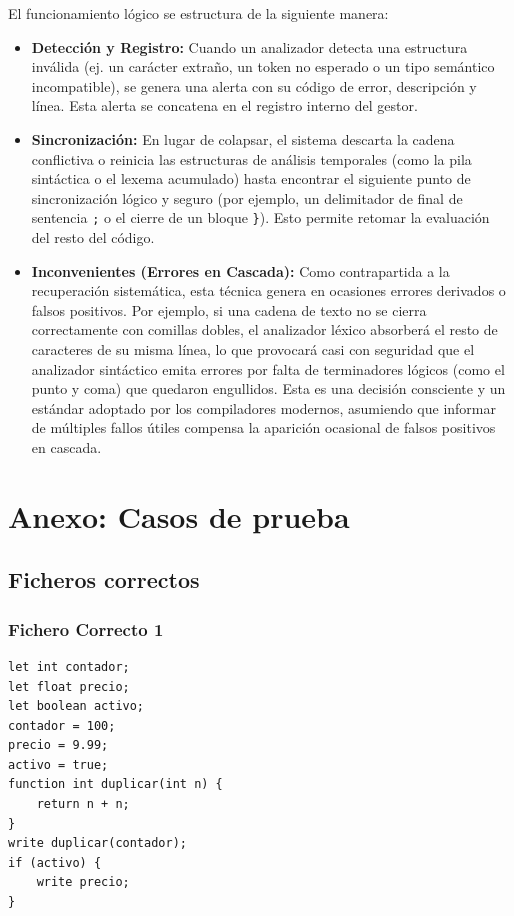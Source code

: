 \documentclass{article}
\begin{document}
El funcionamiento lógico se estructura de la siguiente manera:
\begin{itemize}
    \item \textbf{Detección y Registro:} Cuando un analizador detecta una estructura inválida (ej. un carácter extraño, un token no esperado o un tipo semántico incompatible), se genera una alerta con su código de error, descripción y línea. Esta alerta se concatena en el registro interno del gestor.
    \item \textbf{Sincronización:} En lugar de colapsar, el sistema descarta la cadena conflictiva o reinicia las estructuras de análisis temporales (como la pila sintáctica o el lexema acumulado) hasta encontrar el siguiente punto de sincronización lógico y seguro (por ejemplo, un delimitador de final de sentencia \texttt{;} o el cierre de un bloque \texttt{\}}). Esto permite retomar la evaluación del resto del código.
    \item \textbf{Inconvenientes (Errores en Cascada):} Como contrapartida a la recuperación sistemática, esta técnica genera en ocasiones errores derivados o falsos positivos. Por ejemplo, si una cadena de texto no se cierra correctamente con comillas dobles, el analizador léxico absorberá el resto de caracteres de su misma línea, lo que provocará casi con seguridad que el analizador sintáctico emita errores por falta de terminadores lógicos (como el punto y coma) que quedaron engullidos. Esta es una decisión consciente y un estándar adoptado por los compiladores modernos, asumiendo que informar de múltiples fallos útiles compensa la aparición ocasional de falsos positivos en cascada.
\end{itemize}

\newpage

\section{Anexo: Casos de prueba}

\subsection{Ficheros correctos}

\subsubsection{Fichero Correcto 1}
\begin{lstlisting}[title={fichero1.txt}]
let int contador;
let float precio;
let boolean activo;
contador = 100;
precio = 9.99;
activo = true;
function int duplicar(int n) {
    return n + n;
}
write duplicar(contador);
if (activo) {
    write precio;
}
\end{lstlisting}
\end{document}
